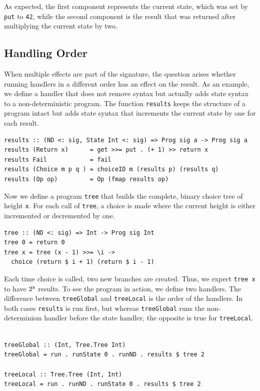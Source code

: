\documentclass[a4paper, 11pt, fleqn, twoside]{scrreprt}
\newcommand{\hinl}[1]{\texttt{#1}}
\begin{document}
As expected, the first component represents the current state, which was set by \hinl{put} to \hinl{42}, while the second component is the result that was returned after multiplying the current state by two.

\subsection{Handling Order}
When multiple effects are part of the signature, the question arises whether running handlers in a different order has an effect on the result.
As an example, we define a handler that does not remove syntax but actually adds state syntax to a non-deterministic program.
The function \hinl{results} keeps the structure of a program intact but adds state syntax that increments the current state by one for each result.

\begin{verbatim}
results :: (ND <: sig, State Int <: sig) => Prog sig a -> Prog sig a
results (Return x)      = get >>= put . (+ 1) >> return x
results Fail            = fail
results (Choice m p q ) = choiceID m (results p) (results q)
results (Op op)         = Op (fmap results op)
\end{verbatim}

Now we define a program \hinl{tree} that builds the complete, binary choice tree of height \hinl{x}.
For each call of \hinl{tree}, a choice is made where the current height is either incremented or decremented by one.

\begin{verbatim}
tree :: (ND <: sig) => Int -> Prog sig Int
tree 0 = return 0
tree x = tree (x - 1) >>= \i -> 
  choice (return $ i + 1) (return $ i - 1)
\end{verbatim}

Each time choice is called, two new branches are created.
Thus, we expect \hinl{tree x} to have $2^\text{\hinl{x}}$ results.
To see the program in action, we define two handlers.
The difference between \hinl{treeGlobal} and \hinl{treeLocal} is the order of the handlers.
In both cases \hinl{results} is run first, but whereas \hinl{treeGlobal} runs the non-determinism handler before the state handler, the opposite is true for \hinl{treeLocal}.

\begin{verbatim}

treeGlobal :: (Int, Tree.Tree Int)
treeGlobal = run . runState 0 . runND . results $ tree 2

treeLocal :: Tree.Tree (Int, Int)
treeLocal = run . runND . runState 0 . results $ tree 2
\end{verbatim}
\end{document}
